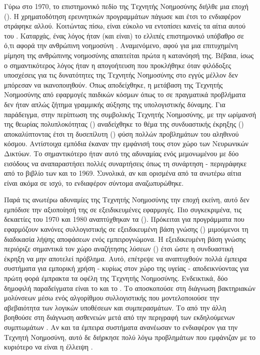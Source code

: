 Γύρω στο 1970, το επιστημονικό πεδίο της Τεχνητής Νοημοσύνης διήλθε μια εποχή  (). Η χρηματοδότηση ερευνητικών προγραμμάτων πάγωσε και έτσι το ενδιαφέρον στράφηκε αλλού. Κοιτώντας πίσω, είναι εύκολο να εντοπίσει κανείς τα αίτια αυτού του . Καταρχάς, ένας λόγος ήταν (και είναι) το ελλιπές επιστημονικό υπόβαθρο σε ό,τι αφορά την ανθρώπινη νοημοσύνη \cite{mitchell2021ai}. Αναμενόμενο, αφού για μια επιτυχημένη μίμηση της ανθρώπινης νοημοσύνης απαιτείται πρώτα η κατανόησή της. Βέβαια, ίσως ο σημαντικότερος λόγος ήταν η απογοήτευση που προκλήθηκε όταν φιλόδοξες υποσχέσεις για τις δυνατότητες της Τεχνητής Νοημοσύνης στο εγγύς μέλλον δεν μπόρεσαν να ικανοποιηθούν. Όπως αποδείχθηκε, η μετάβαση της Τεχνητής Νοημοσύνης από εφαρμογές παιδικών κόσμων όπως το  σε πραγματικά προβλήματα δεν ήταν απλώς ζήτημα γραμμικής αύξησης της υπολογιστικής δύναμης. Για παράδειγμα, στην περίπτωση της συμβολικής Τεχνητής Νοημοσύνης, με την ωρίμανσή της θεωρίας πολυπλοκότητας () αναδείχθηκε το θέμα της συνδυαστικής έκρηξης () αποκαλύπτοντας έτσι τη δυσεπίλυτη () φύση πολλών προβλημάτων του αληθινού κόσμου. Αντίστοιχα εμπόδια έκαναν την εμφάνισή τους στον χώρο των Νευρωνικών Δικτύων. Το σημαντικότερο ήταν αυτό της αδυναμίας ενός μεμονωμένου  με δύο εισόδους να αναπαραστήσει πολλές συναρτήσεις όπως τη συνάρτηση  \cite{russell2020artificial} - περιγράφηκε από το βιβλίο  των  και  το 1969. Συνολικά, αν και ορισμένα από τα ανωτέρω αίτια είναι ακόμα σε ισχύ, το ενδιαφέρον σύντομα αναζωπυρώθηκε.
\par

Παρά τις ανωτέρω αδυναμίες της Τεχνητής Νοημοσύνης την εποχή εκείνη, αυτό δεν εμπόδισε την αξιοποίησή της σε εξειδικευμένες εφαρμογές. Πιο συγκεκριμένα, τις δεκαετίες του 1970 και 1980 αναπτύχθηκαν τα  (). Πρόκειται για προγράμματα που εφαρμόζουν κανόνες συλλογιστικής σε εξειδικευμένη βάση γνώσης () μιμούμενοι τη διαδικασία λήψης αποφάσεων ενός εμπειρογνώμονα. Η εξειδικευμένη βάση γνώσης περιόριζε σημαντικά τον χώρο αναζήτησης λύσεων () έτσι ώστε η συνδυαστική έκρηξη να μην αποτελεί πρόβλημα. Αυτό, επέτρεψε να αναπτυχθούν πολλά έμπειρα συστήματα για εμπορική χρήση - κυρίως στον χώρο της υγείας - αποδεικνύοντας για πρώτη φορά έμπρακτα τα οφέλη της Τεχνητής Νοημοσύνης. Ενδεικτικά, δύο δημοφιλή παραδείγματα είναι το  και το . Το  αποσκοπούσε στη διάγνωση βακτηριακών μολύνσεων μέσω ενός αλγορίθμου συλλογιστικής που μοντελοποιούσε την αβεβαιότητα των λογικών υποθέσεων και συμπερασμάτων. Το  από την άλλη βοηθούσε στη διάγνωση ασθενειών μετά από την περιγραφή των εκδηλούμενων συμπτωμάτων \cite{todd1992introduction}. Αν και τα έμπειρα συστήματα ανανέωσαν το ενδιαφέρον για την Τεχνητή Νοημοσύνη, αυτό δε διήρκησε πολύ λόγω προβλημάτων που εμφάνιζαν με το κυριότερο να είναι η έλλειψη  \cite{bell1985expert}.
\par

